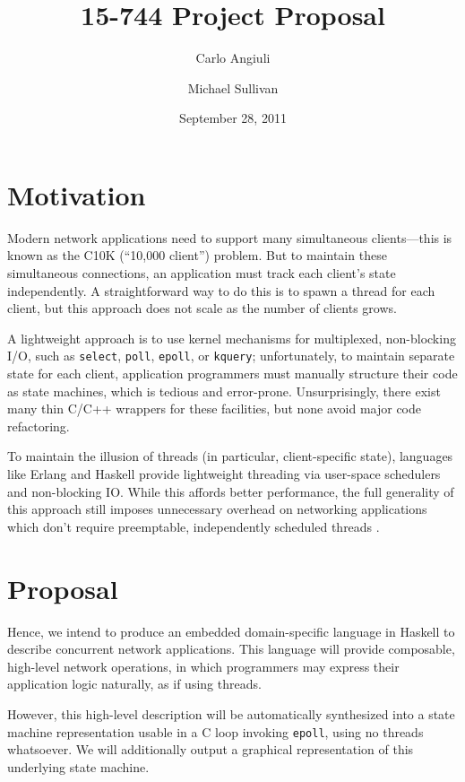 \documentclass{article}
\title{15-744 Project Proposal}
\author{Carlo Angiuli \and Michael Sullivan}
\date{September 28, 2011}
\renewcommand{\t}{\texttt}
\begin{document}
\maketitle


\section{Motivation}

Modern network applications need to support many simultaneous clients---this is
known as the C10K (``10,000 client'') problem\cite{Kegel}. But to maintain these
simultaneous connections, an application must track each client's state
independently. A straightforward way to do this is to spawn a thread for each
client, but this approach does not scale as the number of clients grows. 

A lightweight approach is to use kernel mechanisms for multiplexed, non-blocking
I/O, such as \t{select}, \t{poll}, \t{epoll}, or \t{kquery}; unfortunately, to
maintain separate state for each client, application programmers must manually
structure their code as state machines, which is tedious and error-prone.
Unsurprisingly, there exist many thin C/C++ wrappers for these facilities, but
none avoid major code refactoring.

To maintain the illusion of threads (in particular, client-specific state),
languages like Erlang and Haskell provide lightweight threading via user-space
schedulers and non-blocking IO. While this affords better performance, the full
generality of this approach still imposes unnecessary overhead on networking
applications which don't require preemptable, independently scheduled threads
\cite{Vinoski}.

\section{Proposal}

Hence, we intend to produce an embedded domain-specific language in Haskell to
describe concurrent network applications. This language will provide composable,
high-level network operations, in which programmers may express their
application logic naturally, as if using threads. 

However, this high-level description will be automatically synthesized into a
state machine representation usable in a C loop invoking \t{epoll}, using no
threads whatsoever. We will additionally output a graphical representation of
this underlying state machine.
\end{document}
